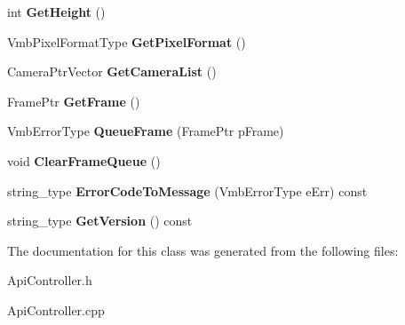 \begin{DoxyCompactItemize}
int {\bfseries Get\+Height} ()
\item 
\mbox{\label{class_a_v_t_1_1_vmb_a_p_i_1_1_examples_1_1_api_controller_a96fd45e6340edb52d183d9ddb295855f}} 
Vmb\+Pixel\+Format\+Type {\bfseries Get\+Pixel\+Format} ()
\item 
\mbox{\label{class_a_v_t_1_1_vmb_a_p_i_1_1_examples_1_1_api_controller_a261219b35a38ec62ac0626aee98e0d73}} 
Camera\+Ptr\+Vector {\bfseries Get\+Camera\+List} ()
\item 
\mbox{\label{class_a_v_t_1_1_vmb_a_p_i_1_1_examples_1_1_api_controller_af121f3e4df713736760a4d5b068587e3}} 
Frame\+Ptr {\bfseries Get\+Frame} ()
\item 
\mbox{\label{class_a_v_t_1_1_vmb_a_p_i_1_1_examples_1_1_api_controller_a85e6f90f7b3c5ed798b421c8c5a496e5}} 
Vmb\+Error\+Type {\bfseries Queue\+Frame} (Frame\+Ptr p\+Frame)
\item 
\mbox{\label{class_a_v_t_1_1_vmb_a_p_i_1_1_examples_1_1_api_controller_afceb5dda5360c1bd461d15814b06ea99}} 
void {\bfseries Clear\+Frame\+Queue} ()
\item 
\mbox{\label{class_a_v_t_1_1_vmb_a_p_i_1_1_examples_1_1_api_controller_a9283d59d95244c49d67d9d105edf9e62}} 
string\+\_\+type {\bfseries Error\+Code\+To\+Message} (Vmb\+Error\+Type e\+Err) const
\item 
\mbox{\label{class_a_v_t_1_1_vmb_a_p_i_1_1_examples_1_1_api_controller_abe622e905662caee773149dd658bf51f}} 
string\+\_\+type {\bfseries Get\+Version} () const
\end{DoxyCompactItemize}


The documentation for this class was generated from the following files\+:\begin{DoxyCompactItemize}
\item 
Api\+Controller.\+h\item 
Api\+Controller.\+cpp\end{DoxyCompactItemize}
